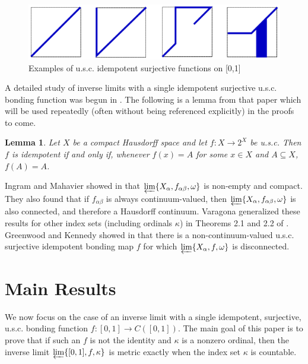 \documentclass{amsart}
\newtheorem{lemma}[theorem]{Lemma}
\theoremstyle{definition}
\begin{document}
\begin{figure}
\begin{center}
\includegraphics[width=\linewidth]{idempotent_usc.pdf}
\end{center}
\caption{Examples of u.s.c. idempotent surjective functions on [0,1]}
\label{idempotentUsc}
\end{figure}

A detailed study of inverse limits with a single idempotent surjective u.s.c. bonding function was begun in \cite{varagona}. The following is a lemma from that paper which will be used repeatedly (often without being referenced explicitly) in the proofs to come.

\begin{lemma} \label{idemlemma}  Let $X$ be a compact Hausdorff space and let $f: X \rightarrow 2^{X}$ be u.s.c. Then $f$ is idempotent if and only if, whenever $f(x) = A$ for some $x \in X$ and $A \subseteq X$, $f(A) = A$.
\end{lemma}

Ingram and Mahavier showed in \cite{i m paper} that $\varprojlim \{X_{\alpha}, f_{\alpha \beta}, \omega\}$ is non-empty and compact. They also found that
if $f_{\alpha \beta}$ is always continuum-valued, then $\varprojlim \{X_{\alpha}, f_{\alpha \beta}, \omega\}$ is also connected, and therefore a Hausdorff continuum. Varagona generalized these results for other index sets (including ordinals $\kappa$) in Theorems 2.1 and 2.2 of \cite{varagona}. Greenwood and Kennedy showed in \cite{greenwood kennedy} that there is a non-continuum-valued u.s.c. surjective idempotent bonding map $f$ for which $\varprojlim \{X_{\alpha}, f, \omega\}$ is disconnected.

\section{Main Results}

We now focus on the case of an inverse limit with a single idempotent, surjective, u.s.c. bonding function $f: [0,1] \rightarrow C([0,1])$. The main goal of this paper is to prove that if such an $f$ is not the identity and $\kappa$ is a nonzero ordinal, then the inverse limit $\varprojlim \{[0,1], f, \kappa\}$ is metric exactly when the index set $\kappa$ is countable.
\end{document}
